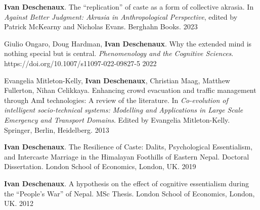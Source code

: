 \begin{cvpublications}

  \cvpublication
  {\textbf{Ivan Deschenaux}. The ``replication'' of caste as a form of collective akrasia. In \textit{Against Better Judgment: Akrasia in Anthropological Perspective}, edited by Patrick McKearny and Nicholas Evans. Berghahn Books.} %
    {2023} %


  \cvpublication
  {Giulio Ongaro, Doug Hardman, \textbf{Ivan Deschenaux}. Why the extended mind is nothing special but is central. \textit{Phenomenology and the Cognitive Sciences}. https://doi.org/10.1007/s11097-022-09827-5} %
    {2022} %

  \cvpublication
  {Evangelia Mitleton-Kelly, \textbf{Ivan Deschenaux}, Christian Maag, Matthew Fullerton, Nihan Celikkaya. Enhancing crowd evacuation and traffic management through AmI technologies: A review of the literature. In \textit{Co-evolution of intelligent socio-technical systems: Modelling and Applications in Large Scale Emergency and Transport Domains}. Edited by Evangelia Mitleton-Kelly. Springer, Berlin, Heidelberg.} %
    {2013} %


\end{cvpublications}



\begin{cvpublications}

  \cvpublication
  {\textbf{Ivan Deschenaux}. The Resilience of Caste: Dalits, Psychological Essentialism, and Intercaste Marriage in the Himalayan Foothills of Eastern Nepal. Doctoral Dissertation. London School of Economics, London, UK.} %
    {2019} %

  \cvpublication
  {\textbf{Ivan Deschenaux}. A hypothesis on the effect of cognitive essentialism during the ``People's War'' of Nepal. MSc Thesis. London School of Economics, London, UK.} %
    {2012} %

\end{cvpublications}
